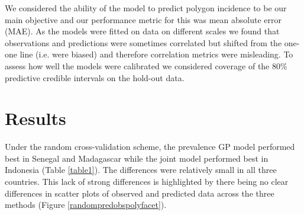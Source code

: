 \documentclass{statsoc}
\begin{document}
\begin{table}
\caption{\label{table1}Summary of out-of-sample accuracy for all cross-validation experiments. 
Mean absolute error of predicted incidence rate against out-of-sample observed data for three countries.}
\centering
{}
\end{table}


We considered the ability of the model to predict polygon incidence to be our main objective and our performance metric for this was mean absolute error (MAE).
As the models were fitted on data on different scales we found that observations and predictions were sometimes correlated but shifted from the one-one line (i.e. were biased) and therefore correlation metrics were misleading.
To assess how well the models were calibrated we considered coverage of the 80\% predictive credible intervals on the hold-out data.



\section*{Results}


Under the random cross-validation scheme, the prevalence GP model performed best in Senegal and Madagascar while the joint model performed best in Indonesia (Table \ref{table1}).
The differences were relatively small in all three countries.
This lack of strong differences is highlighted by there being no clear differences in scatter plots of observed and predicted data across the three methods (Figure \ref{randompredobspolyfacet}).
\end{document}
